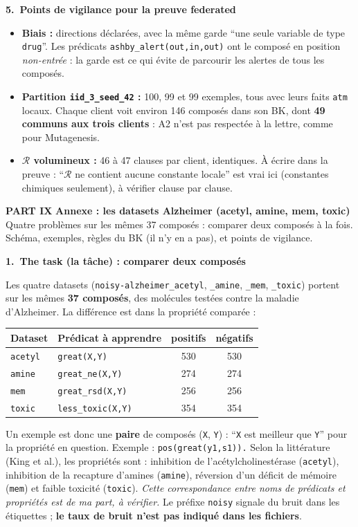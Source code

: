 \documentclass[10pt]{article}
\newcommand{\titrebox}[2]{\needspace{10\baselineskip}\vspace{8pt}
  \begin{tcolorbox}[colback=marine, colframe=marine, arc=0pt, boxrule=0pt,
    top=4pt, bottom=4pt, left=8pt]
  \color{white}\Large\bfseries #1.~#2
  \end{tcolorbox}\vspace{2pt}}
\newcommand{\partie}[3]{\newpage
  \begin{tcolorbox}[colback=pastel, colframe=pastel, arc=0pt, boxrule=0pt,
    top=8pt, bottom=8pt, left=10pt]
  {\fontsize{26}{28}\selectfont\bfseries\textcolor{marine}{PART #1}}\quad
  {\Large\bfseries\textcolor{encre}{#2}}\\[2pt]{\small #3}
  \end{tcolorbox}\vspace{4pt}}
\begin{document}
\titrebox{5}{Points de vigilance pour la preuve federated}
\begin{itemize}
  \item \textbf{Biais :} directions déclarées, avec la même garde ``une seule variable de type \texttt{drug}''. Les prédicats \texttt{ashby\_alert(out,in,out)} ont le composé en position \emph{non-entrée} : la garde est ce qui évite de parcourir les alertes de tous les composés.
  \item \textbf{Partition \texttt{iid\_3\_seed\_42} :} 100, 99 et 99 exemples, tous avec leurs faits \texttt{atm} locaux. Chaque client voit environ 146 composés dans son BK, dont \textbf{49 communs aux trois clients} : A2 n'est pas respectée à la lettre, comme pour Mutagenesis.
  \item \textbf{$\mathcal{R}$ volumineux :} 46 à 47 clauses par client, identiques. À écrire dans la preuve : ``$\mathcal{R}$ ne contient aucune constante locale'' est vrai ici (constantes chimiques seulement), à vérifier clause par clause.
\end{itemize}

\partie{IX}{Annexe : les datasets Alzheimer (acetyl, amine, mem, toxic)}{Quatre problèmes sur les mêmes 37 composés : comparer deux composés à la fois. Schéma, exemples, règles du BK (il n'y en a pas), et points de vigilance.}

\titrebox{1}{The task (la tâche) : comparer deux composés}
Les quatre datasets (\texttt{noisy-alzheimer\_acetyl}, \texttt{\_amine}, \texttt{\_mem}, \texttt{\_toxic}) portent sur les mêmes \textbf{37 composés}, des molécules testées contre la maladie d'Alzheimer. La différence est dans la propriété comparée :
\renewcommand{\arraystretch}{1.25}
\begin{center}
\begin{tabular}{@{}l l c c@{}}
\textbf{Dataset} & \textbf{Prédicat à apprendre} & \textbf{positifs} & \textbf{négatifs}\\\hline
\texttt{acetyl} & \texttt{great(X,Y)} & 530 & 530\\
\texttt{amine} & \texttt{great\_ne(X,Y)} & 274 & 274\\
\texttt{mem} & \texttt{great\_rsd(X,Y)} & 256 & 256\\
\texttt{toxic} & \texttt{less\_toxic(X,Y)} & 354 & 354\\
\end{tabular}
\end{center}
Un exemple est donc une \textbf{paire} de composés (\texttt{X}, \texttt{Y}) : ``\texttt{X} est meilleur que \texttt{Y}'' pour la propriété en question. Exemple : \texttt{pos(great(y1,s1)).}
Selon la littérature (King et al.), les propriétés sont : inhibition de l'acétylcholinestérase (\texttt{acetyl}), inhibition de la recapture d'amines (\texttt{amine}), réversion d'un déficit de mémoire (\texttt{mem}) et faible toxicité (\texttt{toxic}). \emph{Cette correspondance entre noms de prédicats et propriétés est de ma part, à vérifier.}
Le préfixe \texttt{noisy} signale du bruit dans les étiquettes ; \textbf{le taux de bruit n'est pas indiqué dans les fichiers}.
\end{document}
